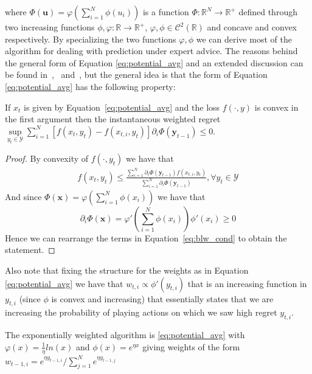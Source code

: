 where $\Phi(\mathbf u)=\varphi\left(\sum\limits_{i=1}^N\phi(u_i)\right)$ is a function $\Phi:\mathbb R^N\to\mathbb R^+$ defined through two increasing functions $\phi,\varphi:\mathbb R\to\mathbb R^+$, $\varphi,\phi\in\mathcal C^2(\mathbb R)$ and concave and convex respectively.
By specializing the two functions $\varphi,\phi$ we can derive most of the algorithm for dealing with prediction under expert advice.
The reasons behind the general form of Equation \eqref{eq:potential_avg} and an extended discussion can be found in~\cite{hart2001general},~\cite{cesa2003potential} and~\cite{blackwell1956analog}, but the general idea is that the form of Equation \eqref{eq:potential_avg} has the following property:

\begin{theorem}
	If $x_t$ is given by Equation~\eqref{eq:potential_avg} and the loss $f(\cdot,y)$ is convex in the first argument then the instantaneous weighted regret $\sup\limits_{y_t\in\mathcal Y}\sum\limits_{i=1}^N[f(x_t,y_t)-f(x_{t,i},y_t)]\partial_i \Phi(\mathbf y_{t-1}) \le 0$.
\end{theorem}

\begin{proof}
	By convexity of $f(\cdot,y_t)$ we have that 
\begin{align}
	f(x_t,y_t)\le\frac{\sum\limits_{i=1}^N\partial_i\Phi(\mathbf y_{t-1})f(x_{t,i},y_t)}{\sum\limits_{i=1}^N\partial_i\Phi(\mathbf y_{t-1})}, \forall y_t\in\mathcal Y\label{eq:blw_cond}
\end{align}
And since $\Phi(\mathbf x)=\varphi\left(\sum\limits_{i=1}^N \phi(x_i)\right)$ we have that $$\partial_i\Phi(\mathbf x)=\varphi'\left(\sum\limits_{i=1}^N\phi(x_i)\right)\phi'(x_i)\ge0$$
Hence we can rearrange the terms in Equation~\eqref{eq:blw_cond} to obtain the statement.
\end{proof}

Also note that fixing the structure for the weights as in Equation \eqref{eq:potential_avg} we have that $w_{t,i}\propto\phi'(y_{t,i})$ that is an increasing function in $y_{t,i}$ (since $\phi$ is convex and increasing) that essentially states that we are increasing the probability of playing actions on which we saw high regret $y_{t,i}$.

\begin{definition}\label{eq:ewf}
	The exponentially weighted algorithm is \eqref{eq:potential_avg} with $\varphi(x)=\frac{1}{\eta}ln(x)$ and $\phi(x)=e^{\eta x}$ giving weights of the form $w_{t-1,i}=e^{\eta y_{t-1,i}}/\sum\limits_{j=1}^Ne^{\eta y_{t-1,j}}$
\end{definition}

